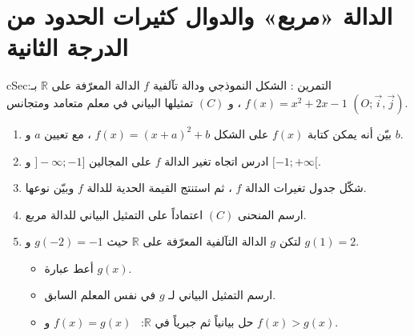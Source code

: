 \documentclass[12pt,a4paper]{article}
\newenvironment{BOX}[2]{\begin{otherlanguage}{english}\begin{arbox}{#1}{#2}}{\end{arbox}\end{otherlanguage}}
\newcounter{exo}
\newenvironment{tamrin}[1]{\stepcounter{exo}\begin{BOX}{cSec}{التمرين \theexo: #1}}{\end{BOX}}
\newcommand{\R}{\mathbb{R}}
\newenvironment{sq}{\begin{itemize}[leftmargin=2.4em,itemsep=3pt]}{\end{itemize}}
\newcommand{\qa}{\item[(أ)]}\newcommand{\qb}{\item[(ب)]}\newcommand{\qc}{\item[(جـ)]}\newcommand{\qd}{\item[(د)]}\newcommand{\qe}{\item[(هـ)]}
\begin{document}
\section{الدالة «مربع» والدوال كثيرات الحدود من الدرجة الثانية}
\begin{tamrin}{الشكل النموذجي ودالة تآلفية}
$f$ الدالة المعرّفة على $\R$ بـ: $f(x)=x^2+2x-1$ ، و $(C)$ تمثيلها البياني في معلم متعامد ومتجانس $(O;\vec i,\vec j)$.
\begin{enumerate}
\item بيّن أنه يمكن كتابة $f(x)$ على الشكل $f(x)=(x+a)^2+b$ ، مع تعيين $a$ و $b$.
\item ادرس اتجاه تغير الدالة $f$ على المجالين $]-\infty;-1]$ و $[-1;+\infty[$.
\item شكّل جدول تغيرات الدالة $f$ ، ثم استنتج القيمة الحدية للدالة $f$ وبيّن نوعها.
\item ارسم المنحنى $(C)$ اعتماداً على التمثيل البياني للدالة مربع.
\item لتكن $g$ الدالة التآلفية المعرّفة على $\R$ حيث $g(-2)=-1$ و $g(1)=2$.
\begin{sq}
\qa أعط عبارة $g(x)$.
\qb ارسم التمثيل البياني لـ $g$ في نفس المعلم السابق.
\qc حل بيانياً ثم جبرياً في $\R$: \ $f(x)=g(x)$ و $f(x)>g(x)$.
\end{sq}
\end{enumerate}
\end{tamrin}
\end{document}
